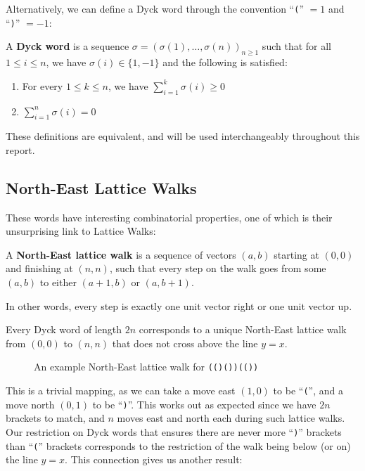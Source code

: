 Alternatively, we can define a Dyck word through the convention ``\texttt{(}'' $= 1$ and ``\texttt{)}'' $= -1$:

\begin{definition}
    \label{def:seqDyck}
    A \textbf{Dyck word} is a sequence $\sigma=(\sigma(1), \dots, \sigma(n))_{n\geq 1}$ such that for all $1\leq i\leq n$, we have ${\sigma(i)}\in\{1, -1\}$ and the following is satisfied:
    \begin{enumerate}
        \item For every \! $1 \leq k \leq n$, we have \! $\sum_{i = 1}^{k} \sigma(i) \geq 0$ 
        \item $\sum_{i = 1}^{n} \sigma(i) = 0$
    \end{enumerate} 
\end{definition}

These definitions are equivalent, and will be used interchangeably throughout this report.

\subsection{North-East Lattice Walks}
These words have interesting combinatorial properties, one of which is their unsurprising link to Lattice Walks:

\begin{definition} 
    A \textbf{North-East lattice walk} is a sequence of vectors $(a, b)$ starting at $(0, 0)$ and finishing at $(n, n)$, such that every step on the walk goes from some $(a, b)$ to either $(a+1, b)$ or $(a, b+1)$.
\end{definition}
In other words, every step is exactly one unit vector right or one unit vector up.

\begin{theorem}
    Every Dyck word of length $2n$ corresponds to a unique North-East lattice walk from $(0, 0)$ to $(n, n)$ that does not cross above the line $y = x$. 
\end{theorem}

\begin{figure}[h]
    \centering
    
    \caption{An example North-East lattice walk for \texttt{(()())(())}}
    \label{fig:latticeWalk}
\end{figure}

This is a trivial mapping, as we can take a move east $(1,0)$ to be ``\texttt{(}'', and a move north $(0,1)$ to be ``\texttt{)}''. This works out as expected since we have $2n$ brackets to match, and $n$ moves east and north each during such lattice walks. Our restriction on Dyck words that ensures there are never more ``\texttt{)}'' brackets than ``\texttt{(}'' brackets corresponds to the restriction of the walk being below (or on) the line $y = x$. This connection gives us another result:

